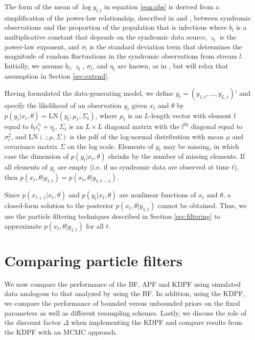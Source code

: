 \documentclass{elsarticle}
\begin{document}
The form of the mean of $\log y_{l,t}$ in equation \eqref{eqn:obs} is derived from a simplification of the power-law relationship, described in \citet{skvortsov2012monitoring} and \citet{Gins:Mohe:Pate:Bram:Smol:Bril:dete:2009}, between syndromic observations and the proportion of the population that is infectious where $b_l$ is a multiplicative constant that depends on the syndromic data source, $\varsigma_l$ is the power-law exponent, and $\sigma_l$ is the standard deviation term that determines the magnitude of random fluctuations in the syndromic observations from stream $l$. Initially, we assume $b_l$, $\varsigma_l$, $\sigma_l$, and $\eta_l$ are known, as in \citep{skvortsov2012monitoring}, but will relax that assumption in Section \ref{sec:extend}.

Having formulated the data-generating model, we define $y_t = (y_{1,t},\ldots,y_{L,t})'$ and specify the likelihood of an observation $y_t$ given $x_t$ and $\theta$ by $p(y_t|x_t,\theta) = \mbox{LN}(y_t;\mu_t,\Sigma_t)$, where $\mu_t$ is an $L$-length vector with element $l$ equal to $b_li_t^{\varsigma_l} + \eta_l$, $\Sigma_t$ is an $L \times L$ diagonal matrix with the $l^{\mbox{th}}$ diagonal equal to $\sigma_l^2$, and $\mbox{LN}(.;\mu,\Sigma)$ is the pdf of the log-normal distribution with mean $\mu$ and covariance matrix $\Sigma$ on the log scale. Elements of $y_t$ may be missing, in which case the dimension of $p(y_t|x_t,\theta)$ shrinks by the number of missing elements. If all elements of $y_t$ are empty (i.e. if no syndromic data are observed at time $t$), then $p(x_t,\theta|y_{1:t})=p(x_t,\theta|y_{1:t-1})$.

Since $p(x_{t+1}|x_t,\theta)$ and $p(y_t|x_t,\theta)$ are nonlinear functions of $x_t$ and $\theta$, a closed-form solution to the posterior $p(x_t,\theta|y_{1:t})$ cannot be obtained. Thus, we use the particle filtering techniques described in Section \ref{sec:filtering} to approximate $p(x_t,\theta|y_{1:t})$ for all $t$.

\section{Comparing particle filters} \label{sec:results}

We now compare the performance of the BF, APF and KDPF using simulated data analogous to that analyzed by \citet{skvortsov2012monitoring} using the BF. In addition, using the KDPF, we compare the performance of bounded versus unbounded priors on the fixed parameters as well as different resampling schemes. Lastly, we discuss the role of the discount factor $\Delta$ when implementing the KDPF and compare results from the KDPF with an MCMC approach.
\end{document}
